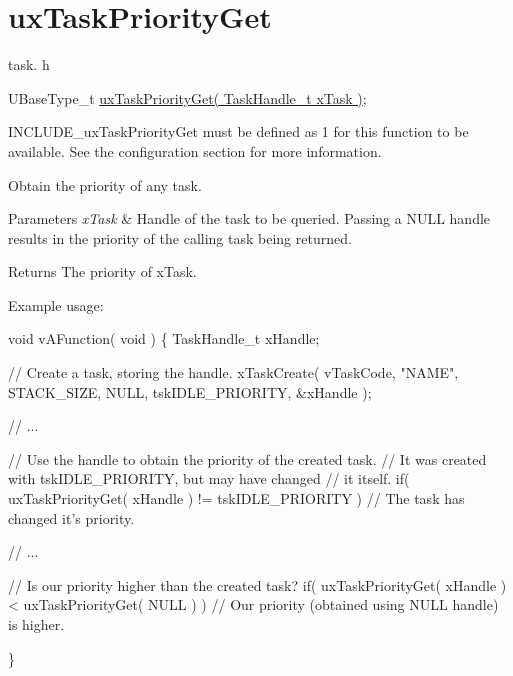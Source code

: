 \hypertarget{group__ux_task_priority_get}{}\section{ux\+Task\+Priority\+Get}
\label{group__ux_task_priority_get}
task. h 
\begin{DoxyPre}UBaseType\_t \hyperlink{task_8h_a3edc3f1a0adc8403f42529bce4ae3446}{uxTaskPriorityGet( TaskHandle\_t xTask )};\end{DoxyPre}


I\+N\+C\+L\+U\+D\+E\+\_\+ux\+Task\+Priority\+Get must be defined as 1 for this function to be available. See the configuration section for more information.

Obtain the priority of any task.


\begin{DoxyParams}{Parameters}
{\em x\+Task} & Handle of the task to be queried. Passing a N\+U\+LL handle results in the priority of the calling task being returned.\\
\hline
\end{DoxyParams}
\begin{DoxyReturn}{Returns}
The priority of x\+Task.
\end{DoxyReturn}
Example usage\+: 
\begin{DoxyPre}
void vAFunction( void )
\{
TaskHandle\_t xHandle;
\begin{DoxyVerb}// Create a task, storing the handle.
xTaskCreate( vTaskCode, "NAME", STACK_SIZE, NULL, tskIDLE_PRIORITY, &xHandle );

// ...

// Use the handle to obtain the priority of the created task.
// It was created with tskIDLE_PRIORITY, but may have changed
// it itself.
if( uxTaskPriorityGet( xHandle ) != tskIDLE_PRIORITY )
{
 // The task has changed it's priority.
}

// ...

// Is our priority higher than the created task?
if( uxTaskPriorityGet( xHandle ) < uxTaskPriorityGet( NULL ) )
{
 // Our priority (obtained using NULL handle) is higher.
}
\end{DoxyVerb}

\}
  \end{DoxyPre}
 